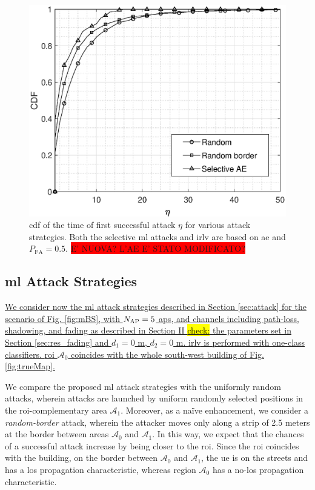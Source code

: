 \documentclass[draftcls,onecolumn,12pt]{IEEEtran}
\begin{document}
{\begin{figure}[t]
    \centering
    \includegraphics[width=0.6\columnwidth]{res_selective_AE.eps}
    \caption{\ac{cdf} of the time of first successful attack $\eta$ for various attack strategies. Both the selective \ac{ml} attacks  and \ac{irlv} are based on \ac{ae} and $P_{\text{FA}}= 0.5$. \colorbox{red}{E' NUOVA? L'AE E' STATO MODIFICATO?}}
    \label{fig:selectiveAE}
\end{figure}



\subsection{\ac{ml} Attack Strategies}

\uline{We consider now the \ac{ml} attack strategies described in Section \ref{sec:attack} for the scenario of Fig. \ref{fig:mBS}, with $N_{\rm AP} =5$ \acp{ap}, and channels including path-loss, shadowing, and fading as described in Section II \hl{check:} the parameters set in  Section \ref{sec:res_fading} and $d_1=0$ m, $d_2=0$ m.  \ac{irlv} is  performed with one-class classifiers.  \ac{roi} $\mathcal A_0$ coincides with the whole south-west building of Fig. \ref{fig:trueMap}. } 


We compare the proposed \ac{ml} attack strategies with the uniformly random attacks, wherein attacks are launched by uniform randomly selected positions in the \ac{roi}-complementary area $\mathcal{A}_1$.  Moreover, as a na\"ive enhancement, we consider a \emph{random-border} attack, wherein the attacker moves only along a strip of 2.5 meters at the border between areas $\mathcal{A}_0$ and $\mathcal A_1$. In this way, we expect that the chances of a successful attack increase by being closer to the \ac{roi}. Since the \ac{roi} coincides with the building, on the border between $\mathcal A_0$ and $\mathcal A_1$, the \ac{ue} is on the streets and has a \ac{los} propagation characteristic, whereas region $\mathcal A_0$ has a no-\ac{los} propagation characteristic. 

}
\end{document}
